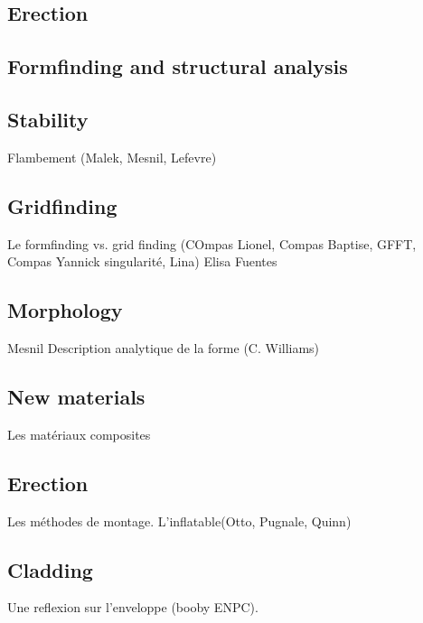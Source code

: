 \subsection{Erection}


\cite{Labonnote2016,Fernandes2016}


\subsection{Formfinding and structural analysis}


\cite{DuPeloux2015}
\citet{Malek2012}

\subsection{Stability}
Flambement (Malek, Mesnil, Lefevre)
\citet{Mesnil2013}
\citet{Mesnil2015a}
\citet{Mesnil2017a}
\citet{Lefevre2015}
\citet{Tayeb2013}
\cite{Toussaint2007}

\subsection{Gridfinding}
Le formfinding vs. grid finding (COmpas Lionel, Compas Baptise, GFFT, Compas Yannick singularité, Lina)
Elisa Fuentes

\cite{DuPeloux2011}
\cite{Lafuente2015}

\subsection{Morphology}
\cite{Douthe2016a}
\cite{Jensen2013}
Mesnil
Description analytique de la forme (C. Williams)

\subsection{New materials}
\cite{Douthe2010a}
\cite{Kotelnikova2012}
\cite{Kotelnikova2013}
Les matériaux composites

\subsection{Erection}
Les méthodes de montage. L'inflatable(Otto, Pugnale, Quinn)
\cite{IL10}
\cite{Quinn2014}
\cite{Liuti2015}
\citet{Liuti2016}

\subsection{Cladding}
Une reflexion sur l'enveloppe (booby ENPC).
\citet{Lafuente2014}
\citet{Cuvilliers2017}
\cite{Filz2015}

